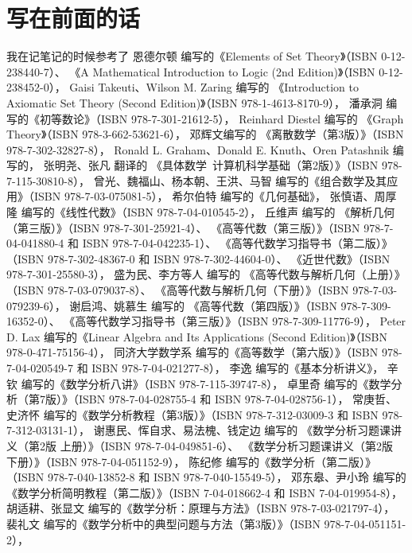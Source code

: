 \chapter*{写在前面的话}
我在记笔记的时候参考了
恩德尔顿 编写的《Elements of Set Theory》（ISBN 0-12-238440-7）、
《A Mathematical Introduction to Logic (2nd Edition)》（ISBN 0-12-238452-0），
Gaisi Takeuti、Wilson M. Zaring 编写的
《Introduction to Axiomatic Set Theory (Second Edition)》（ISBN 978-1-4613-8170-9），
潘承洞 编写的《初等数论》（ISBN 978-7-301-21612-5），
Reinhard Diestel 编写的
《Graph Theory》（ISBN 978-3-662-53621-6），
邓辉文编写的
《离散数学（第3版）》（ISBN 978-7-302-32827-8），
Ronald L. Graham、Donald E. Knuth、Oren Patashnik 编写的，
张明尧、张凡 翻译的
《具体数学\ 计算机科学基础（第2版）》（ISBN 978-7-115-30810-8），
曾光、魏福山、杨本朝、王洪、马智 编写的《组合数学及其应用》（ISBN 978-7-03-075081-5），
希尔伯特 编写的《几何基础》，
张慎语、周厚隆 编写的《线性代数》（ISBN 978-7-04-010545-2），
丘维声 编写的
《解析几何（第三版）》（ISBN 978-7-301-25921-4）、
《高等代数（第三版）》（ISBN 978-7-04-041880-4 和 ISBN 978-7-04-042235-1）、
《高等代数学习指导书（第二版）》（ISBN 978-7-302-48367-0 和 ISBN 978-7-302-44604-0）、
《近世代数》（ISBN 978-7-301-25580-3），
盛为民、李方等人 编写的
《高等代数与解析几何（上册）》（ISBN 978-7-03-079037-8）、
《高等代数与解析几何（下册）》（ISBN 978-7-03-079239-6），
谢启鸿、姚慕生 编写的
《高等代数（第四版）》（ISBN 978-7-309-16352-0）、
《高等代数学习指导书（第三版）》（ISBN 978-7-309-11776-9），
Peter D. Lax 编写的《Linear Algebra and Its Applications (Second Edition)》（ISBN 978-0-471-75156-4），
同济大学数学系 编写的《高等数学（第六版）》（ISBN 978-7-04-020549-7 和 ISBN 978-7-04-021277-8），
李逸 编写的《基本分析讲义》，
辛钦 编写的《数学分析八讲》（ISBN 978-7-115-39747-8），
卓里奇 编写的《数学分析（第7版）》（ISBN 978-7-04-028755-4 和 ISBN 978-7-04-028756-1），
常庚哲、史济怀 编写的《数学分析教程（第3版）》（ISBN 978-7-312-03009-3 和 ISBN 978-7-312-03131-1），
谢惠民、恽自求、易法槐、钱定边 编写的
《数学分析习题课讲义（第2版 上册）》（ISBN 978-7-04-049851-6）、
《数学分析习题课讲义（第2版 下册）》（ISBN 978-7-04-051152-9），
陈纪修 编写的《数学分析（第二版）》（ISBN 978-7-040-13852-8 和 ISBN 978-7-040-15549-5），
邓东皋、尹小玲 编写的《数学分析简明教程（第二版）》（ISBN 7-04-018662-4 和 ISBN 7-04-019954-8），
胡适耕、张显文 编写的《数学分析：原理与方法》（ISBN 978-7-03-021797-4），
裴礼文 编写的《数学分析中的典型问题与方法（第3版）》（ISBN 978-7-04-051151-2），
